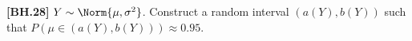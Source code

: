 \begin{exercise}
	\textbf{[BH.28]}  $Y \sim  \Norm{\mu, \sigma^2}$. Construct a random interval $(a(Y), b(Y))$ such that $P(\mu\in(a(Y), b(Y)) ) \approx 0.95$.
\end{exercise}
